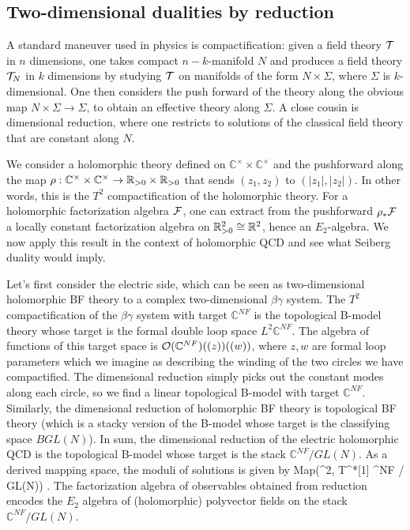 \documentclass[11pt]{amsart}
\def\C{{\mathbb{C}}}
\begin{document}
\subsection{Two-dimensional dualities by reduction}

A standard maneuver used in physics is compactification:
given a field theory $\mathcal T$ in $n$ dimensions, one takes compact $n-k$-manifold $N$ and produces a field theory $\mathcal T_N$ in $k$ dimensions by studying $\mathcal T$ on manifolds of the form $N \times \Sigma$, where $\Sigma$ is $k$-dimensional.
One then considers the push forward of the theory along the obvious map $N \times \Sigma \to \Sigma$, to obtain an effective theory along $\Sigma$.
A close cousin is dimensional reduction, where one restricts to solutions of the classical field theory that are constant along $N$.

We consider a holomorphic theory defined on $\C^\times \times \C^\times$ and the pushforward along the map $\rho: \mathbb C^\times \times \mathbb C^\times \to \mathbb R_{>0} \times \mathbb R_{>0}$ that sends $(z_1,z_2)$ to $(|z_1|, |z_2|)$.
In other words, this is the $T^2$ compactification of the holomorphic theory.
For a holomorphic factorization algebra $\mathcal F$, one can extract from the pushforward $\rho_* \mathcal F$ a locally constant factorization algebra on $\mathbb R_{> 0}^2 \cong \mathbb R^2$, hence an $E_2$-algebra.
We now apply this result in the context of holomorphic QCD and see what Seiberg duality would imply.

Let's first consider the electric side, 
which can be seen as two-dimensional holomorphic BF theory to a complex two-dimensional $\beta\gamma$ system.
The $T^2$ compactification of the $\beta\gamma$ system with target $\C^{NF}$ is the topological B-model theory whose target is the formal double loop space $L^2\C^{NF}$. 
The algebra of functions of this target space is $\cO(\C^{NF}) ((z))((w))$, 
where $z,w$ are formal loop parameters which we imagine as describing the winding of the two circles we have compactified. 
The dimensional reduction simply picks out the constant modes along each circle, so we find a linear topological B-model with target $\C^{NF}$.
Similarly, the dimensional reduction of holomorphic BF theory is topological BF theory (which is a stacky version of the B-model whose target is the classifying space $BGL(N)$).
In sum, the dimensional reduction of the electric holomorphic QCD is the topological B-model whose target is the stack $\C^{NF} / GL(N)$.
As a derived mapping space, the moduli of solutions is given by
\beqn
{\rm Map}\left(\RR^2, T^*[1] \C^{NF} / GL(N)\right) .
\eeqn
The factorization algebra of observables obtained from reduction encodes the $E_2$ algebra of (holomorphic) polyvector fields on the stack~$\C^{NF} / GL(N)$. 
\end{document}
